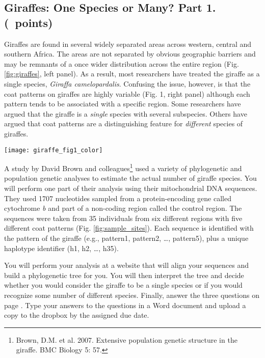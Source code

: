 \documentclass[11pt, addpoints]{exam}
\begin{document}
\subsection*{Giraffes: One Species or Many? Part 1. (\numpoints\ points)}

Giraffes are found in several widely separated areas across western,
central and southern Africa. The areas are not separated by obvious
geographic barriers and may be remnants of a once wider distribution
across the entire region (Fig. \ref{fig:giraffes}, left panel). As a result, most
researchers have treated the giraffe as a single species, \textit{Giraffa
camelopardalis}. Confusing the issue, however, is that the coat patterns
on giraffes are highly variable (Fig. 1, right panel) although each
pattern tends to be associated with a specific region. Some researchers
have argued that the giraffe is a \emph{single} species with several
subspecies. Others have argued that coat patterns are a distinguishing
feature for \emph{different} species of giraffes.

\begin{center}
	\texttt{[image: giraffe\_fig1\_color]}
\end{center}

A study by David Brown and colleagues\footnote{Brown, D.M. et al. 2007.
  Extensive population genetic structure in the giraffe. BMC Biology 5:
  57.} used a variety of phylogenetic and population genetic analyses to
estimate the actual number of giraffe species. You will perform one part
of their analysis using their mitochondrial DNA sequences. They used
1707 nucleotides sampled from a protein-encoding gene called cytochrome
\textit{b} and part of a non-coding region called the control region. The
sequences were taken from 35 individuals from six different regions with
five different coat patterns (Fig. \ref{fig:sample_sites}). Each sequence is identified with
the pattern of the giraffe (e.g., pattern1, pattern2, \ldots{},
pattern5), plus a unique haplotype identifier (h1, h2, \ldots{}, h35).

You will perform your analysis at a website that will align your
sequences and build a phylogenetic tree for you. You will then interpret
the tree and decide whether you would consider the giraffe to be a
single species or if you would recognize some number of different
species. Finally, answer the three questions on page \pageref{sec:questions}. Type your
answers to the questions in a Word document and upload a copy to the dropbox by the assigned due date.
\end{document}
